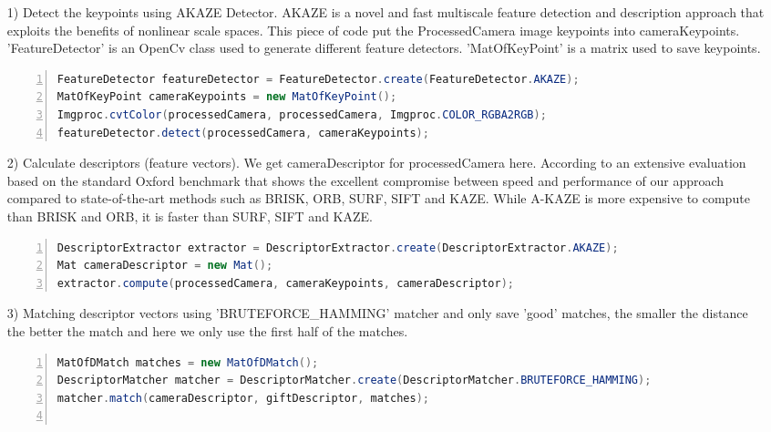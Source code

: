 \begin{enumerate}
\item[1)] Detect the keypoints using AKAZE Detector. AKAZE is a novel and fast multiscale feature detection and description approach that exploits the benefits of nonlinear scale spaces.\cite{alcantarilla2011fast} This piece of code put the ProcessedCamera image keypoints into cameraKeypoints. 'FeatureDetector' is an OpenCv class used to generate different feature detectors. 'MatOfKeyPoint' is a matrix used to save keypoints.
\begin{lstlisting}[language={java},
        numbers=left,basicstyle=\small\ttfamily,breaklines=true]
FeatureDetector featureDetector = FeatureDetector.create(FeatureDetector.AKAZE);
MatOfKeyPoint cameraKeypoints = new MatOfKeyPoint();
Imgproc.cvtColor(processedCamera, processedCamera, Imgproc.COLOR_RGBA2RGB);
featureDetector.detect(processedCamera, cameraKeypoints);
\end{lstlisting} 
\item[2)] Calculate descriptors (feature vectors). We get cameraDescriptor for processedCamera here. According to an extensive evaluation based on the standard Oxford benchmark \cite{mikolajczyk2005} that shows the excellent compromise between speed and performance of our approach compared to state-of-the-art methods such as BRISK, ORB, SURF, SIFT and KAZE. While A-KAZE is more expensive to compute than BRISK and ORB, it is faster than SURF, SIFT and KAZE.\cite{alcantarilla2011fast}
\begin{lstlisting}[language={java},
        numbers=left,basicstyle=\small\ttfamily,breaklines=true]
DescriptorExtractor extractor = DescriptorExtractor.create(DescriptorExtractor.AKAZE);
Mat cameraDescriptor = new Mat();
extractor.compute(processedCamera, cameraKeypoints, cameraDescriptor);
\end{lstlisting} 
\item[3)] Matching descriptor vectors using 'BRUTEFORCE\_HAMMING' matcher and only save 'good' matches, the smaller the distance the better the match and here we only use the first half of the matches. 
\begin{lstlisting}[language={java},
        numbers=left,basicstyle=\small\ttfamily,breaklines=true]
MatOfDMatch matches = new MatOfDMatch();
DescriptorMatcher matcher = DescriptorMatcher.create(DescriptorMatcher.BRUTEFORCE_HAMMING);
matcher.match(cameraDescriptor, giftDescriptor, matches);
            

\end{lstlisting}
\end{enumerate}

